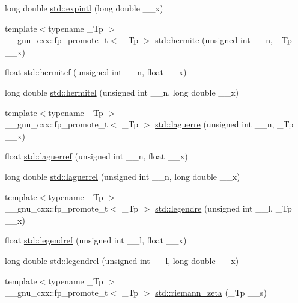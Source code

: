 \begin{DoxyCompactItemize}
long double \hyperlink{group__mathsf__std_ga1329130b32328d0666e290ee5931fa4f}{std\+::expintl} (long double \+\_\+\+\_\+x)
\item 
{\footnotesize template$<$typename \+\_\+\+Tp $>$ }\\\+\_\+\+\_\+gnu\+\_\+cxx\+::fp\+\_\+promote\+\_\+t$<$ \+\_\+\+Tp $>$ \hyperlink{group__mathsf__std_ga8bd1626f1e3f7256c4fd13579f881183}{std\+::hermite} (unsigned int \+\_\+\+\_\+n, \+\_\+\+Tp \+\_\+\+\_\+x)
\item 
float \hyperlink{group__mathsf__std_ga94dae7444bb349e33057a92932db8abe}{std\+::hermitef} (unsigned int \+\_\+\+\_\+n, float \+\_\+\+\_\+x)
\item 
long double \hyperlink{group__mathsf__std_ga21f8e312ee3e65286f86bf141b0f32e0}{std\+::hermitel} (unsigned int \+\_\+\+\_\+n, long double \+\_\+\+\_\+x)
\item 
{\footnotesize template$<$typename \+\_\+\+Tp $>$ }\\\+\_\+\+\_\+gnu\+\_\+cxx\+::fp\+\_\+promote\+\_\+t$<$ \+\_\+\+Tp $>$ \hyperlink{group__mathsf__std_ga9d7b24a11dad27690387405548973ef9}{std\+::laguerre} (unsigned int \+\_\+\+\_\+n, \+\_\+\+Tp \+\_\+\+\_\+x)
\item 
float \hyperlink{group__mathsf__std_gada763419b0e21b38e38daa8b6eb56a8c}{std\+::laguerref} (unsigned int \+\_\+\+\_\+n, float \+\_\+\+\_\+x)
\item 
long double \hyperlink{group__mathsf__std_gaaf8b141edf9163b37ea4f2ed3e0191fc}{std\+::laguerrel} (unsigned int \+\_\+\+\_\+n, long double \+\_\+\+\_\+x)
\item 
{\footnotesize template$<$typename \+\_\+\+Tp $>$ }\\\+\_\+\+\_\+gnu\+\_\+cxx\+::fp\+\_\+promote\+\_\+t$<$ \+\_\+\+Tp $>$ \hyperlink{group__mathsf__std_gad06811f4e139b0ba84235c1f0d34d86e}{std\+::legendre} (unsigned int \+\_\+\+\_\+l, \+\_\+\+Tp \+\_\+\+\_\+x)
\item 
float \hyperlink{group__mathsf__std_gaed94e3c664c99f5204da75be75aeac21}{std\+::legendref} (unsigned int \+\_\+\+\_\+l, float \+\_\+\+\_\+x)
\item 
long double \hyperlink{group__mathsf__std_ga1b39bc22e3cc4860d08eb54099460391}{std\+::legendrel} (unsigned int \+\_\+\+\_\+l, long double \+\_\+\+\_\+x)
\item 
{\footnotesize template$<$typename \+\_\+\+Tp $>$ }\\\+\_\+\+\_\+gnu\+\_\+cxx\+::fp\+\_\+promote\+\_\+t$<$ \+\_\+\+Tp $>$ \hyperlink{group__mathsf__std_gac4ef9d52ee583c77937c3a420b7c72ca}{std\+::riemann\+\_\+zeta} (\+\_\+\+Tp \+\_\+\+\_\+s)

\end{DoxyCompactItemize}
